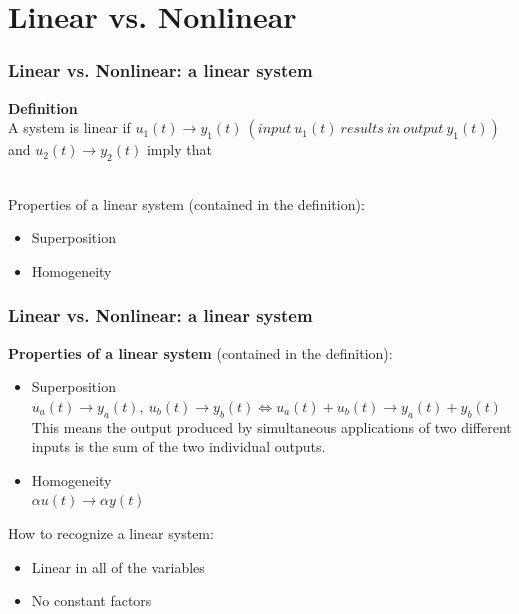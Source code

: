 \documentclass{beamer}
\begin{document}
\section{Linear vs. Nonlinear}

\begin{frame}
\frametitle{Linear vs. Nonlinear: a linear system}
\vspace{-6ex}
\textbf{Definition}\\
\medskip
A system is linear if $u_{1}(t) \rightarrow y_{1}(t)\> (input\> u_{1}(t) \>results\> in\>output \>y_{1}(t))$ and $u_{2}(t) \rightarrow y_{2}(t)$ imply that \\
\\
\begin{flushleft}
Properties of a linear system (contained in the definition):
\end{flushleft}
\vspace{-2ex}
\begin{itemize}
\item Superposition
\item Homogeneity
\end{itemize}
\end{frame}


\begin{frame}
\frametitle{Linear vs. Nonlinear: a linear system}
\vspace {-4ex}
\textbf{Properties of a linear system} (contained in the definition):
\begin{itemize}
\item Superposition\\
\smallskip
$u_{a}(t) \rightarrow y_{a}(t),\> u_{b}(t) \rightarrow y_{b}(t) \Leftrightarrow u_{a}(t) + u_{b}(t) \rightarrow y_{a}(t) + y_{b}(t)$\\
\medskip
This means the output produced by simultaneous applications of two different inputs is the sum of the two individual outputs.
\item Homogeneity\\
\smallskip
$\alpha u(t) \rightarrow \alpha y(t)$\\
\end{itemize}
\bigskip
How to recognize a linear system:
\begin{itemize}
\item Linear in all of the variables
\item No constant factors
\end{itemize}
\end{frame}
\end{document}
